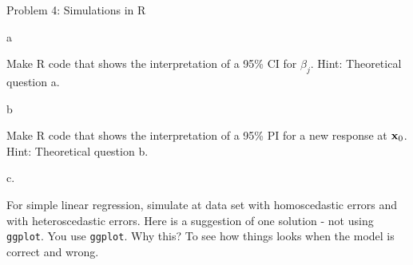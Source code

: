 \documentclass[ignorenonframetext,]{beamer}
\begin{document}
\begin{frame}[fragile]

\begin{block}{Problem 4: Simulations in R}

\begin{block}{a}

Make R code that shows the interpretation of a 95\% CI for \(\beta_j\).
Hint: Theoretical question a.

\end{block}

\begin{block}{b}

Make R code that shows the interpretation of a 95\% PI for a new
response at \({\bf x}_0\). Hint: Theoretical question b.

\end{block}

\begin{block}{c.}

For simple linear regression, simulate at data set with homoscedastic
errors and with heteroscedastic errors. Here is a suggestion of one
solution - not using \texttt{ggplot}. You use \texttt{ggplot}. Why this?
To see how things looks when the model is correct and wrong.


\end{block}
\end{block}
\end{frame}
\end{document}
